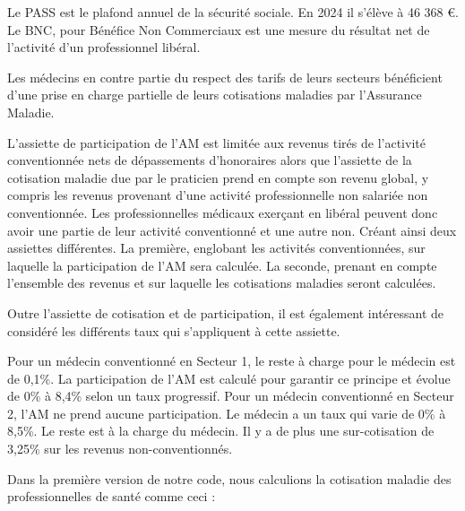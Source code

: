 Le PASS est le plafond annuel de la sécurité sociale. En 2024 il s'élève à 46 368 €.
Le BNC, pour Bénéfice Non Commerciaux est une mesure du résultat net de l'activité d'un professionnel libéral.

Les médecins en contre partie du respect des tarifs de leurs secteurs bénéficient d’une prise en charge partielle de leurs cotisations maladies par l'Assurance Maladie.

L’assiette de participation de l'AM est limitée aux revenus tirés de l’activité conventionnée nets de dépassements d’honoraires alors que l’assiette de la cotisation maladie due par le praticien prend en compte son revenu global, y compris les revenus provenant d’une activité professionnelle non salariée non conventionnée.
Les professionnelles médicaux exerçant en libéral peuvent donc avoir une partie de leur activité conventionné et une autre non. Créant ainsi deux assiettes différentes. La première, englobant les activités conventionnées, sur laquelle la participation de l'AM sera calculée. La seconde, prenant en compte l'ensemble des revenus et sur laquelle les cotisations maladies seront calculées.

Outre l'assiette de cotisation et de participation, il est également intéressant de considéré les différents taux qui s'appliquent à cette assiette.

Pour un médecin conventionné en Secteur 1, le reste à charge pour le médecin est de 0,1\%. La participation de l'AM est calculé pour garantir ce principe et évolue de 0\% à 8,4\% selon un taux progressif. 
Pour un médecin conventionné en Secteur 2, l'AM ne prend aucune participation. Le médecin a un taux qui varie de 0\% à 8,5\%. Le reste est à la charge du médecin. Il y a de plus une sur-cotisation de 3,25\% sur les revenus non-conventionnés.

Dans la première version de notre code, nous calculions la cotisation maladie des professionnelles de santé comme ceci :

